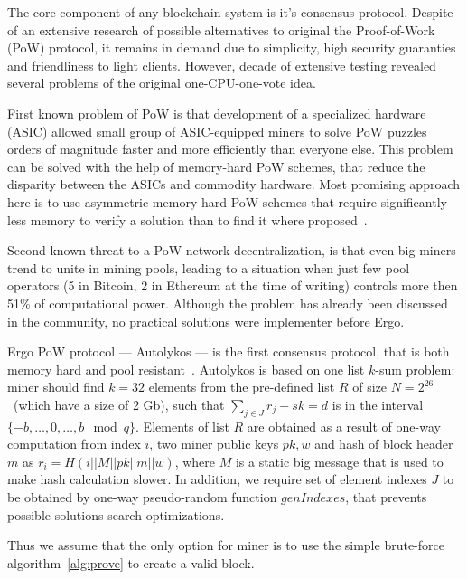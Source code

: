 \documentclass[]{article}
\newcommand{\Ergo}{Ergo}
\begin{document}
    The core component of any blockchain system is it's consensus protocol.
    Despite of an extensive research of possible alternatives to original the Proof-of-Work (PoW) protocol,
    it remains in demand due to simplicity, high security guaranties and friendliness to light clients.
    However, decade of extensive testing revealed several problems of the original one-CPU-one-vote idea.

    First known problem of PoW is that development of a specialized hardware (ASIC) allowed
    small group of ASIC-equipped miners to solve PoW puzzles orders of magnitude faster and more efficiently
    than everyone else. This problem can be solved with the help of memory-hard PoW schemes,
    that reduce the disparity between the ASICs and commodity hardware. Most promising approach here
    is to use asymmetric memory-hard PoW schemes that require significantly less memory
    to verify a solution than to find it where proposed~\cite{biryukov2017equihash,ethHash}.

    Second known threat to a PoW network decentralization, is that even big miners trend to unite in
    mining pools, leading to a situation when just few pool operators (5 in Bitcoin, 2 in Ethereum
    at the time of writing) controls more then 51\% of computational power.
    Although the problem has already been discussed in the community, no practical solutions were
    implementer before \Ergo{}.


    Ergo PoW protocol --- Autolykos --- is the first consensus protocol, that is both memory hard
    and pool resistant~\cite{Ergopow}.
    Autolykos is based on one list $k$-sum problem: miner should find
    $k=32$ elements from the pre-defined list $R$ of size $N=2^{26}$~(which have a size of 2 Gb),
    such that $\sum_{j \in J} r_{j} - sk = d$ is in the interval $\{-b,\dots,0,\dots,b\mod q\}$.
    Elements of list $R$ are obtained as a result of one-way computation from index $i$,
    two miner public keys $pk,w$ and hash of block header $m$ as $r_i=H(i||M||pk||m||w)$,
    where $M$ is a static big message that is used to make hash calculation slower.
    In addition, we require set of element indexes $J$ to be obtained
    by one-way pseudo-random function $genIndexes$, that prevents possible solutions
    search optimizations.

    Thus we assume that the only option for miner is to use the simple brute-force algorithm~\ref{alg:prove} to
    create a valid block.
\end{document}
